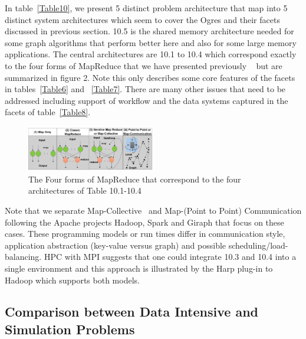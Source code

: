 \documentclass{acm_proc_article-sp}
\begin{document}
In table~\ref{Table10}, we present 5 distinct problem architecture that map into 5 distinct system architectures which seem to cover the Ogres and their facets discussed in previous section. 10.5 is the shared memory architecture needed for some graph algorithms that perform better here and also for some large memory applications. The central architectures are 10.1 to 10.4 which correspond exactly to the four forms of MapReduce that we have presented previously ~\cite{b18} but are summarized in figure 2. Note this only describes some core features of the facets in tables~\ref{Table6} and ~\ref{Table7}. There are many other issues that need to be addressed including support of workflow and the data systems captured in the facets of table~\ref{Table8}.

\begin{figure}
\centering
\includegraphics[width=0.5\textwidth]{mapreduce-four.png}
\caption{The Four forms of MapReduce that correspond to the four architectures of Table 10.1-10.4}
\end{figure}


Note that we separate Map-Collective~\cite{b24,b25} and Map-(Point to Point)
Communication following the Apache projects Hadoop, Spark and Giraph that focus
on these cases. These programming models or run times differ in communication
style, application abstraction (key-value versus graph) and possible
scheduling/load-balancing. HPC with MPI suggests that one could integrate 10.3
and 10.4 into a single environment and this approach is illustrated by the Harp
plug-in to Hadoop which supports both models.


\subsection{Comparison between Data Intensive and Simulation Problems}
\end{document}
